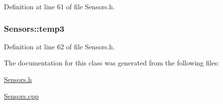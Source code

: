 Definition at line 61 of file Sensors.\+h.

\subsubsection[{\texorpdfstring{temp3}{temp3}}]{ Sensors\+::temp3\hspace{0.3cm}{\ttfamily [private]}}\hypertarget{class_sensors_a6019e66b1f8a52d0f4768d4a928df3d0}{}\label{class_sensors_a6019e66b1f8a52d0f4768d4a928df3d0}


Definition at line 62 of file Sensors.\+h.



The documentation for this class was generated from the following files\+:\begin{DoxyCompactItemize}
\item 
\hyperlink{_sensors_8h}{Sensors.\+h}\item 
\hyperlink{_sensors_8cpp}{Sensors.\+cpp}\end{DoxyCompactItemize}
